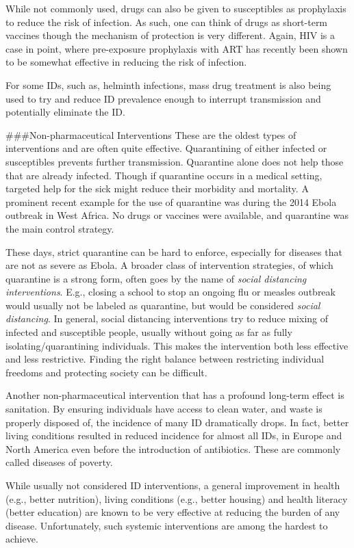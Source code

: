 \documentclass[]{book}
\theoremstyle{definition}
\theoremstyle{definition}
\theoremstyle{definition}
\theoremstyle{remark}
\begin{document}
While not commonly used, drugs can also be given to susceptibles as
prophylaxis to reduce the risk of infection. As such, one can think of
drugs as short-term vaccines though the mechanism of protection is very
different. Again, HIV is a case in point, where pre-exposure prophylaxis
with ART has recently been shown to be somewhat effective in reducing
the risk of infection.

For some IDs, such as, helminth infections, mass drug treatment is also
being used to try and reduce ID prevalence enough to interrupt
transmission and potentially eliminate the ID.

\#\#\#Non-pharmaceutical Interventions These are the oldest types of
interventions and are often quite effective. Quarantining of either
infected or susceptibles prevents further transmission. Quarantine alone
does not help those that are already infected. Though if quarantine
occurs in a medical setting, targeted help for the sick might reduce
their morbidity and mortality. A prominent recent example for the use of
quarantine was during the 2014 Ebola outbreak in West Africa. No drugs
or vaccines were available, and quarantine was the main control
strategy.

These days, strict quarantine can be hard to enforce, especially for
diseases that are not as severe as Ebola. A broader class of
intervention strategies, of which quarantine is a strong form, often
goes by the name of \emph{social distancing interventions}. E.g.,
closing a school to stop an ongoing flu or measles outbreak would
usually not be labeled as quarantine, but would be considered
\emph{social distancing}. In general, social distancing interventions
try to reduce mixing of infected and susceptible people, usually without
going as far as fully isolating/quarantining individuals. This makes the
intervention both less effective and less restrictive. Finding the right
balance between restricting individual freedoms and protecting society
can be difficult.

Another non-pharmaceutical intervention that has a profound long-term
effect is sanitation. By ensuring individuals have access to clean
water, and waste is properly disposed of, the incidence of many ID
dramatically drops. In fact, better living conditions resulted in
reduced incidence for almost all IDs, in Europe and North America even
before the introduction of antibiotics. These are commonly called
diseases of poverty.

While usually not considered ID interventions, a general improvement in
health (e.g., better nutrition), living conditions (e.g., better
housing) and health literacy (better education) are known to be very
effective at reducing the burden of any disease. Unfortunately, such
systemic interventions are among the hardest to achieve.
\end{document}
